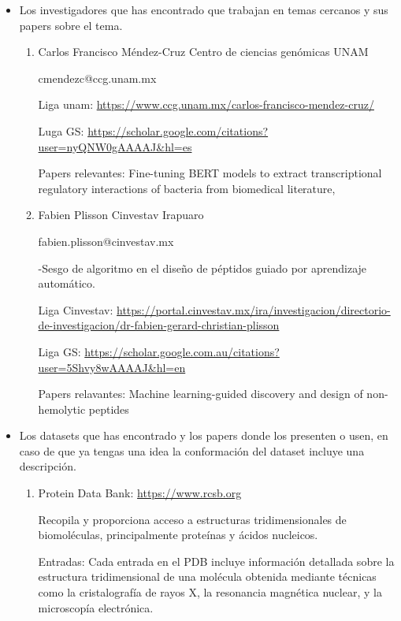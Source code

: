 \documentclass[11pt, twoside]{report}
\begin{document}
\begin{itemize}
    \item Los investigadores que has encontrado que trabajan en temas cercanos y sus papers sobre el tema.
    
    \begin{enumerate}
        \item Carlos Francisco Méndez-Cruz Centro de ciencias genómicas UNAM
        
        cmendezc@ccg.unam.mx
        
        Liga unam: \url{https://www.ccg.unam.mx/carlos-francisco-mendez-cruz/}

        Luga GS: \url{https://scholar.google.com/citations?user=nyQNW0gAAAAJ&hl=es}

        Papers relevantes: Fine-tuning BERT models to extract transcriptional regulatory interactions of bacteria from biomedical literature,


        \item Fabien Plisson Cinvestav Irapuaro 
        
        fabien.plisson@cinvestav.mx

        -Sesgo de algoritmo en el diseño de péptidos guiado por aprendizaje automático.

        Liga Cinvestav: \url{https://portal.cinvestav.mx/ira/investigacion/directorio-de-investigacion/dr-fabien-gerard-christian-plisson}

        Liga GS: \url{https://scholar.google.com.au/citations?user=5Shvy8wAAAAJ&hl=en}

        Papers relavantes: Machine learning-guided discovery and design of non-hemolytic peptides

    \end{enumerate}

    \item Los datasets que has encontrado y los papers donde los presenten o usen, en caso de que ya tengas una idea la conformación del dataset incluye una descripción.
    
    \begin{enumerate}

        \item Protein Data Bank: \url{https://www.rcsb.org }
        
        Recopila y proporciona acceso a estructuras tridimensionales de biomoléculas, principalmente proteínas y ácidos nucleicos.

        Entradas: Cada entrada en el PDB incluye información detallada sobre la estructura tridimensional de una molécula obtenida mediante técnicas como la cristalografía de rayos X, la resonancia magnética nuclear, y la microscopía electrónica.



\end{enumerate}
\end{itemize}
\end{document}
